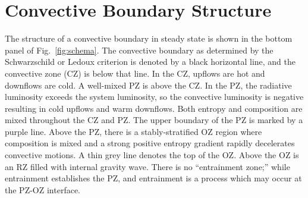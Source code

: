 \section{Convective Boundary Structure}
\label{sec:structure}
The structure of a convective boundary in steady state is shown in the bottom panel of Fig.~\ref{fig:schema}.
The convective boundary as determined by the Schwarzschild or Ledoux criterion is denoted by a black horizontal line, and the convective zone (CZ) is below that line.
In the CZ, upflows are hot and downflows are cold.
A well-mixed PZ is above the CZ.
In the PZ, the radiative luminosity exceeds the system luminosity, so the convective luminosity is negative resulting in cold upflows and warm downflows.
Both entropy and composition are mixed throughout the CZ and PZ.
The upper boundary of the PZ is marked by a purple line.
Above the PZ, there is a stably-stratified OZ region where composition is mixed and a strong positive entropy gradient rapidly decelerates convective motions.
A thin grey line denotes the top of the OZ.
Above the OZ is an RZ filled with internal gravity wave.
There is no ``entrainment zone;'' while entrainment establishes the PZ, and entrainment is a process which may occur at the PZ-OZ interface.
